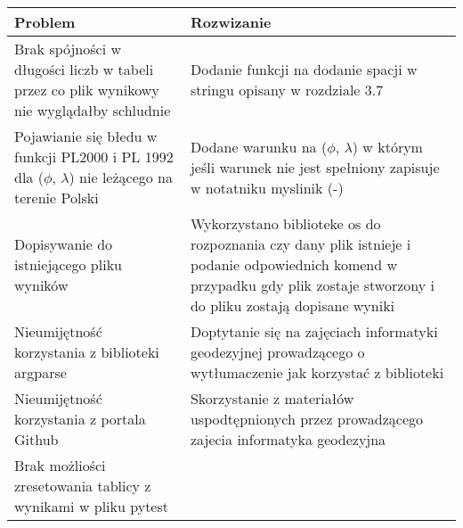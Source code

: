 \begin{table}[h!]
	\centering
	\begin{tabular}{|p{7cm}|p{7cm}|}
		\hline
		 Problem  &  Rozwizanie \\
		\hline
		Brak spójności w długości liczb w tabeli przez co plik wynikowy nie wyglądałby schludnie & Dodanie funkcji na dodanie spacji w stringu opisany w rozdziale 3.7  \\ \hline
		Pojawianie się błedu w funkcji PL2000 i PL 1992 dla ($\phi$, $\lambda$) nie leżącego na terenie Polski & Dodane warunku na ($\phi$, $\lambda$) w którym jeśli warunek nie jest spełniony zapisuje w notatniku myslinik (-)\\ \hline
		Dopisywanie do istniejącego pliku wyników & Wykorzystano biblioteke os do rozpoznania czy dany plik istnieje i podanie odpowiednich komend w przypadku gdy plik zostaje stworzony i do pliku zostają dopisane wyniki\\ \hline
		Nieumijętność korzystania z biblioteki argparse & Doptytanie się na zajęciach informatyki geodezyjnej prowadzącego o wytłumaczenie jak korzystać z biblioteki \\ \hline
		Nieumijętność korzystania z portala Github & Skorzystanie z materiałów uspodtępnionych przez prowadzącego zajecia informatyka geodezyjna\\ \hline
		Brak możliości zresetowania tablicy z wynikami w pliku pytest &  \\ \hline
		
	\end{tabular}
\end{table}
